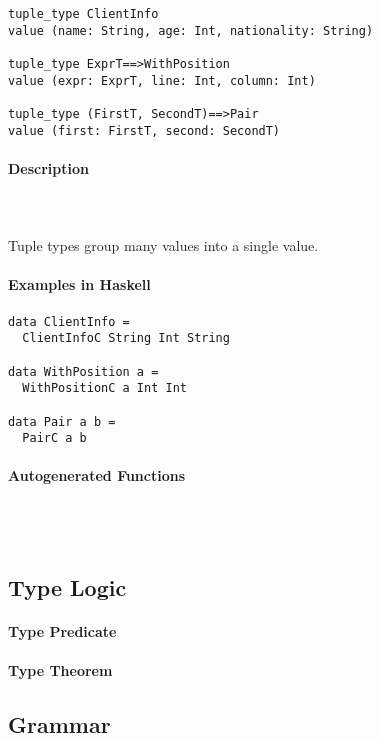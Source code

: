 \documentclass{article}
\def\H{Haskell}
\begin{document}
\begin{verbatim}
tuple_type ClientInfo
value (name: String, age: Int, nationality: String)

tuple_type ExprT==>WithPosition
value (expr: ExprT, line: Int, column: Int)

tuple_type (FirstT, SecondT)==>Pair
value (first: FirstT, second: SecondT)
\end{verbatim}

\paragraph{Description}\mbox{} \\\\
Tuple types group many values into a single value.

\paragraph{Examples in \H}

\begin{verbatim}
data ClientInfo =
  ClientInfoC String Int String

data WithPosition a = 
  WithPositionC a Int Int

data Pair a b = 
  PairC a b
\end{verbatim}

\paragraph{Autogenerated Functions}\mbox{} \\\\

\subsection{Type Logic}

\paragraph{Type Predicate}

\paragraph{Type Theorem}

\subsection{Grammar}
\end{document}
